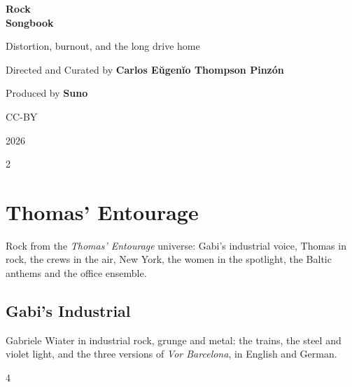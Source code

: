 \documentclass[a4paper,landscape]{memoir}
\begin{document}
\frontmatter
{}

\begin{titlingpage}
\centering
\vspace*{\fill}
{\LARGE\bfseries Rock\\\Huge Songbook\par}
\bigskip
{\large Distortion, burnout, and the long drive home\par}
\vspace*{\fill}
{\normalsize Directed and Curated by \bfseries Carlos Eŭgenĭo Thompson Pinzón\par}
{\normalsize Produced by \bfseries Suno\par}
\bigskip
{\normalsize CC-BY\par}
{\normalsize 2026\par}
\vspace*{\fill}
\end{titlingpage}

\clearpage\begin{multicols*}{2}
\tableofcontents*
\end{multicols*}
\mainmatter
\renewcommand\chaptername{Album~}

\part{Thomas’ Entourage}
Rock from the \emph{Thomas’ Entourage} universe: Gabi’s industrial voice, Thomas in rock, the crews in the air, New York, the women in the spotlight, the Baltic anthems and the office ensemble.

\chapter{Gabi’s Industrial}
Gabriele Wiater in industrial rock, grunge and metal: the trains, the steel and violet light, and the three versions of \emph{Vor Barcelona}, in English and German.
\clearpage\begin{multicols*}{4}
\end{multicols*}
\end{document}
